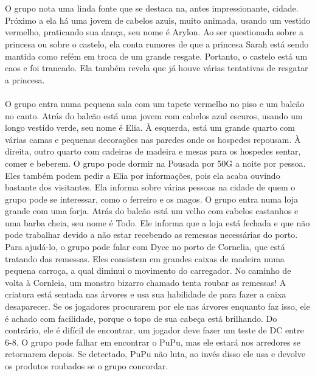 %
\clearpage
%
\\\\
%
 O grupo nota uma linda fonte que se destaca na, antes impressionante, cidade. 
Próximo a ela há uma jovem de cabelos azuis, muito animada, usando um vestido vermelho, praticando sua dança, seu nome é Arylon.
Ao ser questionada sobre a princesa ou sobre o castelo, ela conta rumores de que a princesa Sarah está sendo mantida como refém em troca de um grande resgate.
Portanto, o castelo está um caos e foi trancado.
Ela também revela que já houve várias tentativas de resgatar a princesa.
%
\vfill
%
\\\\
%
 O grupo entra numa pequena sala com um tapete vermelho no piso e um balcão no canto.
Atrás do balcão está uma jovem com cabelos azul escuros, usando um longo vestido verde, seu nome é Elia.
À esquerda, está um grande quarto com várias camas e pequenas decorações nas paredes onde os hospedes repousam.
À direita, outro quarto com cadeiras de madeira e mesas para os hospedes sentar, comer e beberem.
O grupo pode dormir na Pousada por 50G a noite por pessoa.
Eles também podem pedir a Elia por informações, pois ela acaba ouvindo bastante dos visitantes.
Ela informa sobre várias pessoas na cidade de quem o grupo pode se interessar, como o ferreiro e os magos.
%
\vfill
%
 O grupo entra numa loja grande com uma forja.
Atrás do balcão está um velho com cabelos castanhos e uma barba cheia, seu nome é Todo.
Ele informa que a loja está fechada e que não pode trabalhar devido a não estar recebendo as remessas necessárias do porto. 
Para ajudá-lo, o grupo pode falar com Dyce no porto de Cornelia, que está tratando das remessas.
Eles consistem em grandes caixas de madeira numa pequena carroça, a qual diminui o movimento do carregador.
No caminho de volta à Cornleia, um monstro bizarro chamado  tenta roubar as remessas!
A criatura está sentada nas árvores e usa sua habilidade de  para fazer a caixa desaparecer.
Se os jogadores procurarem por ele nas árvores enquanto faz isso, ele é achado com facilidade, porque o topo de sua cabeça está brilhando.
Do contrário, ele é difícil de encontrar, um jogador deve fazer um teste de DC entre 6-8.
O grupo pode falhar em encontrar o PuPu, mas ele estará nos arredores se retornarem depois. Se detectado, PuPu não luta, ao invés disso ele usa  e devolve os produtos roubados se o grupo concordar.
